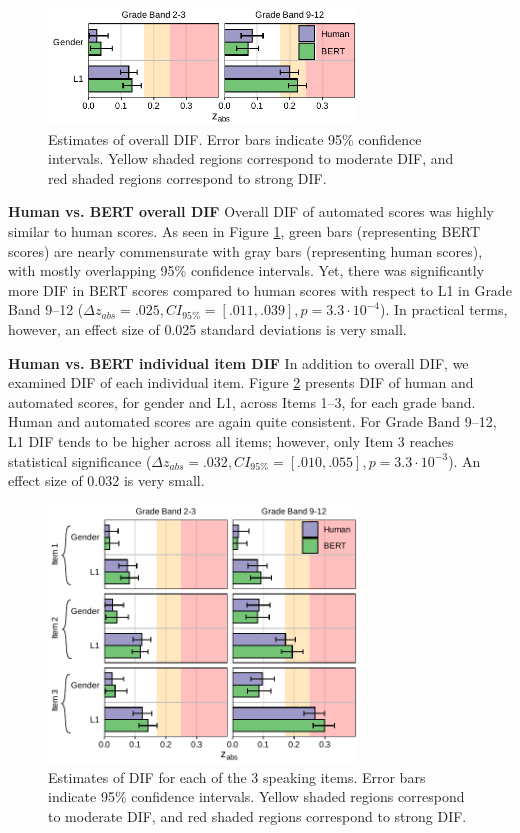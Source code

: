 \documentclass [PhD] {uclathes}
\begin{document}
\begin{figure}[h]
    \centering
    \hspace{-.6cm}
    \includegraphics[width=8.2cm]{figures/20230504_ETS-DIF_BERT_zabs_ovr_edit.pdf}
    \caption{Estimates of overall DIF. Error bars indicate 95\% confidence intervals. Yellow shaded regions correspond to moderate DIF, and red shaded regions correspond to strong DIF.}
    \label{fig:zabs_ovr}
\end{figure}

\noindent \textbf{Human vs. BERT overall DIF} \;
Overall DIF of automated scores was highly similar to human scores. As seen in Figure \ref{fig:zabs_ovr}, green bars (representing BERT scores) are nearly commensurate with gray bars (representing human scores), with mostly overlapping 95\% confidence intervals. Yet, there was significantly more DIF in BERT scores compared to human scores with respect to L1 in Grade Band 9–12 ($\Delta z_{abs} = .025, CI_{95\%} = [.011, .039], p = 3.3 \cdot 10^{-4}$). In practical terms, however, an effect size of 0.025 standard deviations is very small. 

\noindent \textbf{Human vs. BERT individual item DIF} \;
In addition to overall DIF, we examined DIF of each individual item. Figure \ref{fig:zabs_itm} presents DIF of human and automated scores, for gender and L1, across Items 1–3, for each grade band. Human and automated scores are again quite consistent. For Grade Band 9–12, L1 DIF tends to be higher across all items; however, only Item 3 reaches statistical significance ($\Delta z_{abs} = .032, CI_{95\%} = [.010, .055], p = 3.3 \cdot 10^{-3}$). An effect size of 0.032 is very small.

\begin{figure}[h]
    \centering
    \hspace{-.6cm}
    \includegraphics[width=8.2cm]{figures/20230504_ETS-DIF_BERT_zabs_itm_edit.pdf}
    \caption{Estimates of DIF for each of the 3 speaking items. Error bars indicate 95\% confidence intervals. Yellow shaded regions correspond to moderate DIF, and red shaded regions correspond to strong DIF.}
    \label{fig:zabs_itm}
\end{figure}
\end{document}

